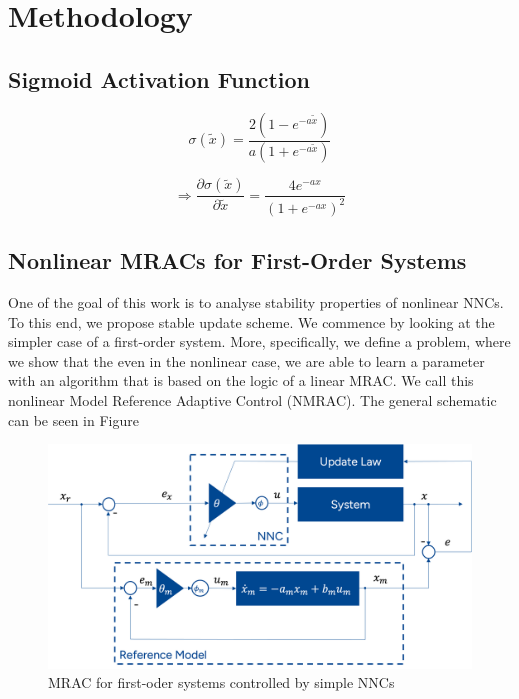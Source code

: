 \section{Methodology}
\subsection{Sigmoid Activation Function}

\begin{equation}
    \sigma (\tilde x) = \frac{2(1-e^{-a\tilde x})}{a(1+e^{-a\tilde x})}
    \label{eq:sigmoid}
\end{equation}

\begin{equation}
   \Rightarrow \frac{\partial \sigma (\tilde x)}{\partial \tilde x} = \frac{4e^{-ax}}{(1+e^{-ax})^2}
    \label{eq:sigmoid-gradient}
\end{equation}

\subsection{Nonlinear MRACs for First-Order Systems}
\label{sec:MRAC-Nonlinear-SISO}
One of the goal of this work is to analyse stability properties of nonlinear NNCs. To this end, we propose stable update scheme. We commence by looking at the simpler case of a first-order system. More, specifically, we define a problem, where we show that the even in the nonlinear case, we are able to learn a parameter with an algorithm that is based on the logic of a linear MRAC. We call this nonlinear Model Reference Adaptive Control (NMRAC). The general schematic can be seen in Figure %

\cite{2020MehediUnderactuatedRotaryInvertedPendulum}

\begin{figure}[ht]
    \centering
    \includegraphics[width=0.8\linewidth]{images/nonlinear_MRAC-Schematic.png}
    \caption{MRAC for first-oder systems controlled by simple NNCs}
    \label{fig:nonlinear-NNC-MRAC}
\end{figure}

